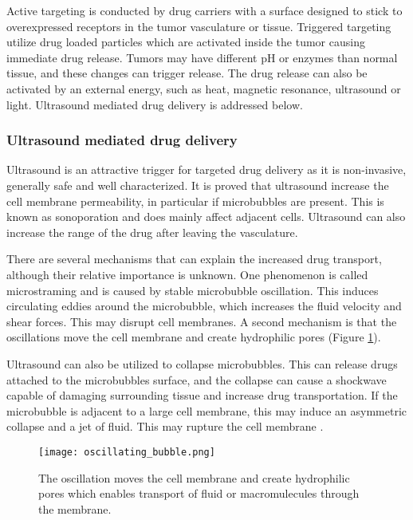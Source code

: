 Active targeting is conducted by drug carriers with a surface designed to stick to overexpressed receptors in the tumor vasculature or tissue. Triggered targeting utilize drug loaded particles which are activated inside the tumor causing immediate drug release. Tumors may have different pH or enzymes than normal tissue,  and these changes can trigger release. The drug release can also be activated by an external energy, such as heat, magnetic resonance, ultrasound or light\cite{Jafari}. Ultrasound mediated drug delivery is addressed below. 
	
\subsubsection{Ultrasound mediated drug delivery}
\label{sec:umdd}
Ultrasound is an attractive trigger for targeted drug delivery as it is non-invasive, generally safe and well characterized. It is proved that ultrasound increase the cell membrane permeability, in particular if microbubbles are present\cite{VanWamel2006a}. This is known as sonoporation and does mainly affect adjacent cells. Ultrasound can also increase the range of the drug after leaving the vasculature\cite{Eggen2013}.

There are several mechanisms that can explain the increased drug transport, although their relative importance is unknown. One phenomenon is called microstraming and is caused by stable microbubble oscillation. This induces circulating eddies around the microbubble, which increases the fluid velocity and shear forces\cite{Nyborg1982}. This may disrupt cell membranes\cite{Marmottant2003}. A second mechanism is that the oscillations move the cell membrane and create hydrophilic pores (Figure \ref{Fig:oscillating_bubble})\cite{VanWamel2006a}.

Ultrasound can also be utilized to collapse microbubbles. This can release drugs attached to the microbubbles surface, and the collapse can cause a shockwave capable of damaging surrounding tissue and increase drug transportation. If the microbubble is adjacent to a large cell membrane, this may induce an asymmetric collapse and a jet of fluid. This may rupture the cell membrane \cite{Pitt2004}.  

\begin{figure}[h]
  \centering
  \texttt{[image: oscillating\_bubble.png]}
  \caption{The oscillation moves the cell membrane and create hydrophilic pores which enables transport of fluid or macromulecules through the membrane\cite{VanWamel2006a}.}
  \label{Fig:oscillating_bubble}
\end{figure}


